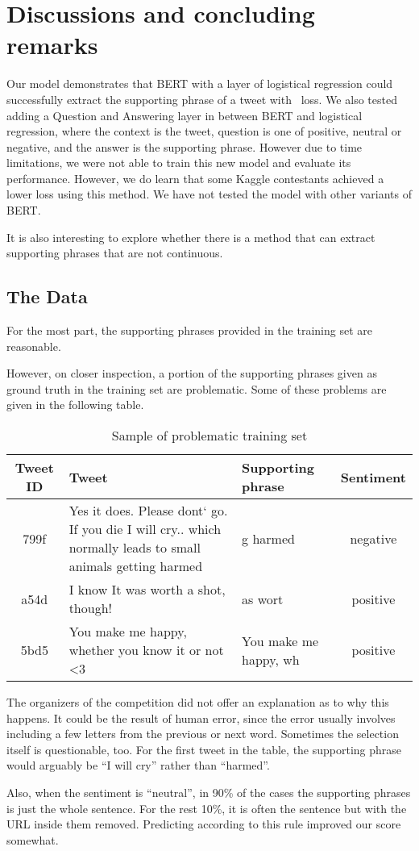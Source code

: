 \section{Discussions and concluding remarks} \label{sec:discussion}

Our model demonstrates that BERT with a layer of logistical regression could successfully extract the supporting phrase of a tweet with \score\ loss. We also tested adding a Question and Answering layer in between BERT and logistical regression, where the context is the tweet, question is one of positive, neutral or negative, and the answer is  the supporting phrase. However due to time limitations, we were not able to train this new model and evaluate its performance. However, we do learn that some Kaggle contestants achieved a lower loss using this method. We have not tested the model with other variants of BERT. 

It is also interesting to explore whether there is a method that can
extract supporting phrases that are not continuous.

\subsection{The Data}
For the most part, the supporting phrases provided in the training set are reasonable.  

However, on closer inspection, a portion of the supporting phrases given as ground
truth in the training set are problematic.  Some of these problems are
given in the following table.

\begin{table}[!h]
	\centering
	\begin{tabular} {c | p{5cm} l c}
	Tweet ID & Tweet & Supporting phrase & Sentiment \\
	\hline
          799f &  Yes it does. Please dont` go. If you die I will
                 cry.. which normally leads to small animals getting
                 harmed & g harmed & negative \\
          \hline
          a54d & I know   It was worth a shot, though! & as wort &
                                                                   positive \\
          \hline
	5bd5 & You make me happy, whether you know it or not  <3 & You make me happy, wh & positive
	\end{tabular}
	\caption{Sample of problematic training set}
\end{table} 

The organizers of the competition did not offer an explanation as to
why this happens.  It could be the result of human error, since the
error usually involves including a few letters from the previous or
next word.  Sometimes the selection itself is questionable, too.  For the
first tweet in the table, the supporting phrase would arguably be ``I
will cry'' rather than ``harmed''.

Also, when the sentiment is ``neutral'', in 90\% of the cases the
supporting phrases is just the whole sentence.  For the rest 10\%, it
is often the sentence but with the URL inside them removed.
Predicting according to this rule improved our score somewhat.

